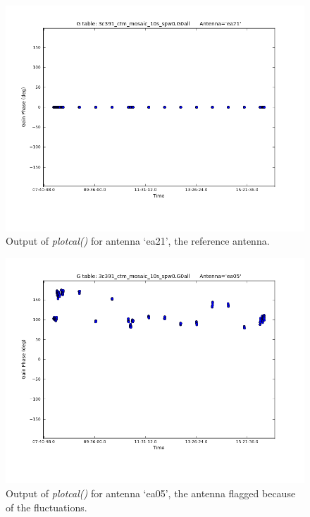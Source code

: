 \documentclass[12pt, a4paper]{article}
\begin{document}
\begin{figure}[h!]
    \centering
    \includegraphics[scale=0.5]{../Imaging/plots/phase_calibration_part4c_question5_ea21.png}
    \caption{Output of \emph{plotcal()} for antenna `ea21', the reference antenna. \label{fig:part4subC2-2}}
\end{figure}

\begin{figure}[h!]
    \centering
    \includegraphics[scale=0.5]{../Imaging/plots/phase_calibration_part4c_question5_ea05.png}
    \caption{Output of \emph{plotcal()} for antenna `ea05', the antenna flagged because of the fluctuations. \label{fig:part4subC2-3}}
\end{figure}
\end{document}
